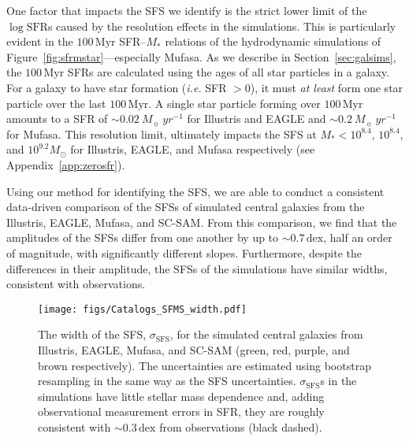 \documentclass[tighten, preprint]{aastex62}
\begin{document}
One factor that impacts the SFS we identify is the strict lower limit of the 
$\log\mathrm{SFR}$s caused by the resolution effects in the simulations. 
This is particularly evident in the $100\,\mathrm{Myr}$ SFR--$M_*$ 
relations of the hydrodynamic simulations of Figure~\ref{fig:sfrmstar}---especially 
{\sc Mufasa}. As we describe in Section~\ref{sec:galsims}, the $100\,\mathrm{Myr}$ 
SFRs are  calculated using the ages of all star particles in a galaxy. For a galaxy to 
have star formation (\emph{i.e.} SFR $> 0$), it must \emph{at least} 
form one star particle over the last $100\,\mathrm{Myr}$. A single star particle 
forming over $100\,\mathrm{Myr}$ amounts to a SFR of 
${\sim}0.02\ M_{\sun}\ yr^{-1}$ for Illustris and EAGLE and
${\sim}0.2\ M_{\sun}\ yr^{-1}$ for {\sc Mufasa}. 
{\color{red}
This resolution limit, ultimately 
impacts the SFS at $M_*{<}10^{8.4}$, $10^{8.4}$, and 
$10^{9.2}M_\odot$ for Illustris, EAGLE, and {\sc Mufasa} respectively (see Appendix~\ref{app:zerosfr}). 
}

{\color{red} Using our method for identifying the SFS, we are able to 
conduct a consistent data-driven comparison of the SFSs of simulated 
central galaxies}
from the Illustris, EAGLE, {\sc Mufasa}, and SC-SAM. From 
this comparison, we find that the amplitudes of the SFSs differ from one 
another by 
{\color{red} up to ${\sim}0.7\,\mathrm{dex}$, half an order of magnitude, 
with significantly different slopes.}
Furthermore, despite the differences in their amplitude, the SFSs of 
the simulations have similar widths, consistent with observations. 
\begin{figure}
\begin{center}
\texttt{[image: figs/Catalogs\_SFMS\_width.pdf]}
\caption{The width of the SFS, $\sigma_\mathrm{SFS}$, for the simulated 
    central galaxies from Illustris, EAGLE, {\sc Mufasa}, and SC-SAM 
    (green, red, purple, and brown respectively). The uncertainties are 
    estimated using bootstrap resampling in the same way as the SFS uncertainties. 
    $\sigma_\mathrm{SFS}$s in the simulations have little stellar mass 
    dependence and, adding observational measurement errors in SFR, 
    they are roughly consistent with ${\sim}0.3\,\mathrm{dex}$ 
    from observations (black dashed).} \label{fig:sfms_width}
\end{center}
\end{figure}
\end{document}
